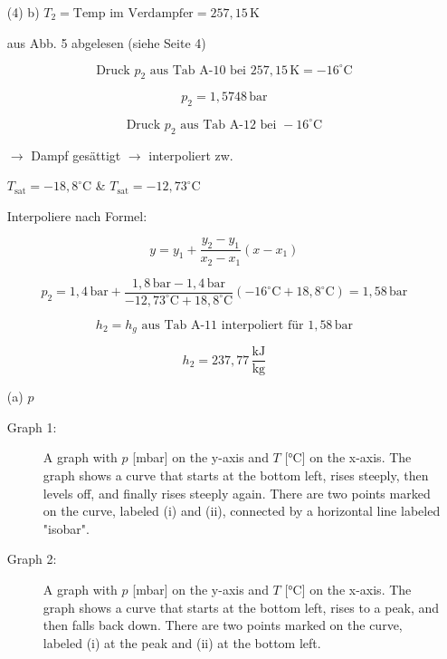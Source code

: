 \begin{enumerate}
    \item[(4)] b) \( T_2 = \text{Temp im Verdampfer} = 257,15 \, \text{K} \)
    
    aus Abb. 5 abgelesen (siehe Seite 4)
    
    \[
    \text{Druck } p_2 \text{ aus Tab A-10 bei } 257,15 \, \text{K} = -16^\circ \text{C}
    \]
    
    \[
    p_2 = 1,5748 \, \text{bar}
    \]
    
    \[
    \text{Druck } p_2 \text{ aus Tab A-12 bei } -16^\circ \text{C}
    \]
    
    \(\rightarrow\) Dampf gesättigt \(\rightarrow\) interpoliert zw.
    
    \( T_{\text{sat}} = -18,8^\circ \text{C} \) \& \( T_{\text{sat}} = -12,73^\circ \text{C} \)
    
    Interpoliere nach Formel:
    
    \[
    y = y_1 + \frac{y_2 - y_1}{x_2 - x_1} (x - x_1)
    \]
    
    \[
    p_2 = 1,4 \, \text{bar} + \frac{1,8 \, \text{bar} - 1,4 \, \text{bar}}{-12,73^\circ \text{C} + 18,8^\circ \text{C}} (-16^\circ \text{C} + 18,8^\circ \text{C}) = 1,58 \, \text{bar}
    \]
    
    \[
    h_2 = h_g \text{ aus Tab A-11 interpoliert für } 1,58 \, \text{bar}
    \]
    
    \[
    h_2 = 237,77 \, \frac{\text{kJ}}{\text{kg}}
    \]
    
    \item[(a)] \( p \)
    
    \begin{description}
        \item[Graph 1:] A graph with \( p \) [mbar] on the y-axis and \( T \) [°C] on the x-axis. The graph shows a curve that starts at the bottom left, rises steeply, then levels off, and finally rises steeply again. There are two points marked on the curve, labeled (i) and (ii), connected by a horizontal line labeled "isobar".
        
        \item[Graph 2:] A graph with \( p \) [mbar] on the y-axis and \( T \) [°C] on the x-axis. The graph shows a curve that starts at the bottom left, rises to a peak, and then falls back down. There are two points marked on the curve, labeled (i) at the peak and (ii) at the bottom left.
    \end{description}
\end{enumerate}

